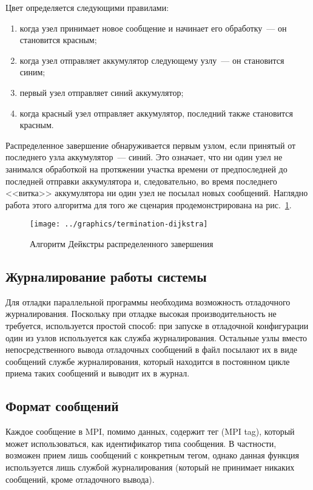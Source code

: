 \documentclass[12pt,a4paper,fleqn]{article}
\begin{document}
Цвет определяется следующими правилами:
\begin{enumerate}
\item когда узел принимает новое сообщение и начинает его обработку~--- он становится красным;
\item когда узел отправляет аккумулятор следующему узлу~--- он становится синим;
\item первый узел отправляет синий аккумулятор;
\item когда красный узел отправляет аккумулятор, последний также становится красным.
\end{enumerate}

Распределенное завершение обнаруживается первым узлом, если принятый от последнего узла
аккумулятор~--- синий. Это означает, что ни один узел не занимался обработкой на протяжении участка
времени от предпоследней до последней отправки аккумулятора и, следовательно, во время последнего
<<витка>> аккумулятора ни один узел не посылал новых сообщений. Наглядно работа этого алгоритма для
того же сценария продемонстрирована на рис.~\ref{fig:termination-dijkstra}.

\begin{figure}[htb]
  \centering
  \texttt{[image: ../graphics/termination-dijkstra]}  
  \caption{Алгоритм Дейкстры распределенного завершения}
\label{fig:termination-dijkstra}
\end{figure}

\subsection{Журналирование работы системы}

Для отладки параллельной программы необходима возможность отладочного
журналирования. Поскольку при отладке высокая производительность не требуется,
используется простой способ: при запуске в отладочной конфигурации один из узлов
используется как служба журналирования. Остальные узлы вместо непосредственного вывода
отладочных сообщений в файл посылают их в виде сообщений службе журналирования, который
находится в постоянном цикле приема таких сообщений и выводит их в журнал.

\subsection{Формат сообщений}

Каждое сообщение в MPI, помимо данных, содержит тег (MPI tag), который может использоваться, как
идентификатор типа сообщения. В частности, возможен прием лишь сообщений с конкретным тегом, однако
данная функция используется лишь службой журналирования (который не принимает никаких сообщений,
кроме отладочного вывода).
\end{document}
